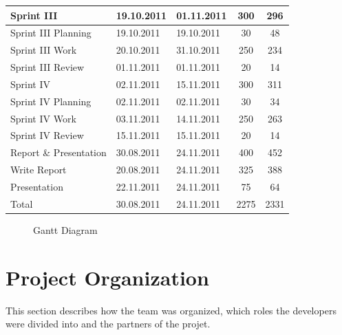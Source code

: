 \begin{table}[!htb]
\begin{tabular}{l l l c c}
	\midrule
	Sprint III & 19.10.2011 & 01.11.2011 & 300 & 296 \\
	\midrule
	Sprint III Planning & 19.10.2011 & 19.10.2011 & 30 & 48 \\
	Sprint III Work & 20.10.2011 & 31.10.2011 & 250 & 234 \\
	Sprint III Review & 01.11.2011 & 01.11.2011 & 20 & 14 \\
	\midrule
	Sprint IV & 02.11.2011 & 15.11.2011 & 300 & 311 \\
	\midrule
	Sprint IV Planning & 02.11.2011 & 02.11.2011 & 30 & 34 \\
	Sprint IV Work & 03.11.2011 & 14.11.2011 & 250 & 263 \\
	Sprint IV Review & 15.11.2011 & 15.11.2011 & 20 & 14 \\
	\midrule
	Report \& Presentation & 30.08.2011 & 24.11.2011 & 400 & 452 \\
	\midrule
	Write Report & 20.08.2011 & 24.11.2011 & 325 & 388 \\
	Presentation & 22.11.2011 & 24.11.2011 & 75 & 64 \\
	\midrule
	Total & 30.08.2011 & 24.11.2011 & 2275 & 2331 \\
	\bottomrule
\end{tabular}
\end{table}

\begin{figure}[!htb]
	\noindent{}
	\caption{Gantt Diagram\label{fig:gantt}}
\end{figure}


\section{Project Organization}
\label{sec:plan:org}
This section describes how the team was organized, which roles the developers were divided into and the partners of the projet.

